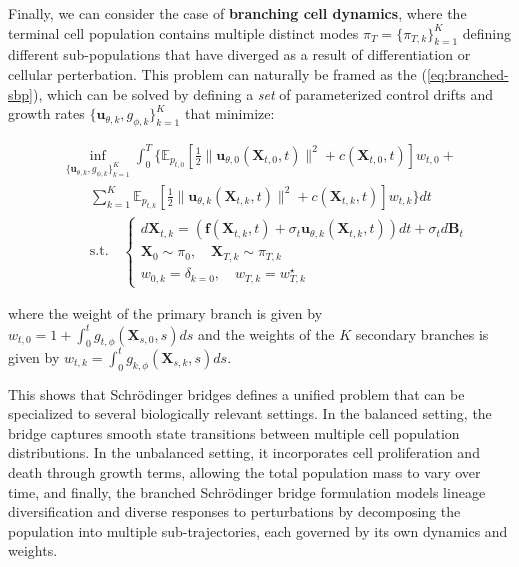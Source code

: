 \documentclass{article}
\begin{document}
{Finally, we can consider the case of \textbf{branching cell dynamics}, where the terminal cell population contains multiple distinct modes $\pi_T=\{\pi_{T,k}\}_{k=1}^K$ defining different sub-populations that have diverged as a result of differentiation or cellular perterbation. This problem can naturally be framed as the (\ref{eq:branched-sbp}), which can be solved by defining a \textit{set} of parameterized control drifts and growth rates $\{\boldsymbol{u}_{\theta, k}, g_{\phi, k}\}_{k=1}^K$ that minimize:
\begin{small}
\begin{align}
    &\inf_{\{\boldsymbol{u}_{\theta, k}, g_{\phi, k}\}_{k=1}^K}\int_0^T\bigg\{\mathbb{E}_{p_{t, 0}}\left[\frac{1}{2}\|\boldsymbol{u}_{\theta, 0}(\boldsymbol{X}_{t, 0},t)\|^2+c(\boldsymbol{X}_{t, 0},t)\right]w_{t, 0}+\nonumber\\
    &\quad\quad \sum_{k=1}^K\mathbb{E}_{p_{t, k}}\left[\frac{1}{2}\|\boldsymbol{u}_{\theta, k}(\boldsymbol{X}_{t, k},t)\|^2+c(\boldsymbol{X}_{t,k},t)\right]w_{t, k}\bigg\}dt\\
    &\quad \quad \text{s.t.}\quad \begin{cases}
        d\boldsymbol{X}_{t, k}=(\boldsymbol{f}(\boldsymbol{X}_{t,k},t)+\sigma_t\boldsymbol{u}_{\theta, k}(\boldsymbol{X}_{t,k},t))dt+\sigma_td\boldsymbol{B}_t\\
        \boldsymbol{X}_0\sim \pi_0, \quad \boldsymbol{X}_{T, k}\sim \pi_{T, k}\\
        w_{0, k}=\delta_{k=0}, \quad w_{T,k}=w^\star_{T,k}
    \end{cases}\nonumber
\end{align}
\end{small}
where the weight of the primary branch is given by $w_{t, 0}=1+\int_0^tg_{t,\phi}(\boldsymbol{X}_{s,0},s)ds$ and the weights of the $K$ secondary branches is given by $w_{t, k}=\int_0^tg_{k,\phi}(\boldsymbol{X}_{s,k},s)ds$.
}

This shows that Schrödinger bridges defines a unified problem that can be specialized to several biologically relevant settings. In the balanced setting, the bridge captures smooth state transitions between multiple cell population distributions. In the unbalanced setting, it incorporates cell proliferation and death through growth terms, allowing the total population mass to vary over time, and finally, the branched Schrödinger bridge formulation models lineage diversification and diverse responses to perturbations by decomposing the population into multiple sub-trajectories, each governed by its own dynamics and weights.
\end{document}
